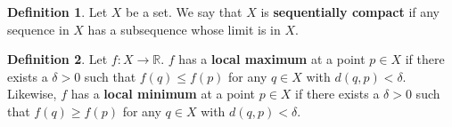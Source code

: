\documentclass[12pt]{article}
\theoremstyle{definition}
\newtheorem{definition}{Definition}
\theoremstyle{named}
\begin{document}
\renewcommand{\thedefinition}{of Sequentially Compact}
\begin{definition}
    Let $X$ be a set. We say that $X$ is \textbf{sequentially compact} if any sequence in $X$ has a subsequence whose limit is in $X$. 
\end{definition}

\renewcommand{\thedefinition}{5.7}
\begin{definition}
    Let $f: X \to \mathbb{R}$. $f$ has a \textbf{local maximum} at a point $p \in X$ if there exists a $\delta > 0$ such that $f(q) \leq f(p)$ for any $q \in X$ with $d(q,p) < \delta$. Likewise, $f$ has a \textbf{local minimum} at a point $p \in X$ if there exists a $\delta > 0$ such that $f(q) \geq f(p)$ for any $q \in X$ with $d(q,p) < \delta$. 
\end{definition}
\end{document}
